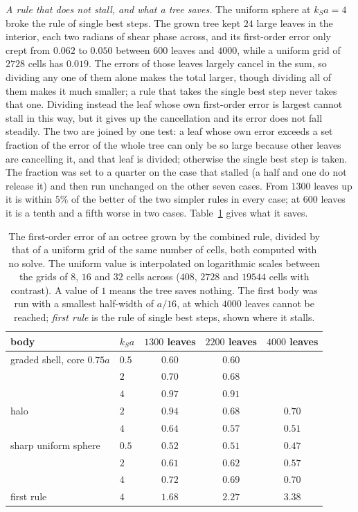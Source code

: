 \documentclass[11pt,a4paper]{article}
\begin{document}
\emph{A rule that does not stall, and what a tree saves.} The uniform sphere at $k_Sa=4$ broke the rule
of single best steps. The grown tree kept $24$ large leaves in the interior, each two radians of shear
phase across, and its first-order error only crept from $0.062$ to $0.050$ between $600$ leaves and $4000$, while a uniform
grid of $2728$ cells has $0.019$. The errors of those leaves largely cancel in the sum, so dividing any
one of them alone makes the total larger, though dividing all of them makes it much smaller; a rule that
takes the single best step never takes that one. Dividing instead the leaf whose own first-order error is
largest cannot stall in this way, but it gives up the cancellation and its error does not fall steadily.
The two are joined by one test: a leaf whose own error exceeds a set fraction of the error of the whole
tree can only be so large because other leaves are cancelling it, and that leaf is divided; otherwise the
single best step is taken. The fraction was set to a quarter on the case that stalled (a half and one do
not release it) and then run unchanged on the other seven cases. From $1300$ leaves up it is within $5\%$ of the
better of the two simpler rules in every case; at $600$ leaves it is a tenth and a fifth worse in two
cases. Table~\ref{tab:greedybodies} gives what it saves.
\begin{table}[htbp]
\centering
\caption{The first-order error of an octree grown by the combined rule, divided by that of a uniform grid
of the same number of cells, both computed with no solve. The uniform value is interpolated on
logarithmic scales between the grids of $8$, $16$ and $32$ cells across ($408$, $2728$ and $19544$ cells
with contrast). A value of $1$ means the tree saves nothing. The first body was run with a smallest
half-width of $a/16$, at which $4000$ leaves cannot be reached; \emph{first rule} is the rule of single best steps,
shown where it stalls.}\label{tab:greedybodies}
\small
\begin{tabular}{@{}llccc@{}}
\toprule
body & $k_Sa$ & $1300$ leaves & $2200$ leaves & $4000$ leaves \\
\midrule
graded shell, core $0.75a$ & $0.5$ & $0.60$ & $0.60$ & \\
                           & $2$   & $0.70$ & $0.68$ & \\
                           & $4$   & $0.97$ & $0.91$ & \\
\midrule
halo                       & $2$   & $0.94$ & $0.68$ & $0.70$ \\
                           & $4$   & $0.64$ & $0.57$ & $0.51$ \\
\midrule
sharp uniform sphere       & $0.5$ & $0.52$ & $0.51$ & $0.47$ \\
                           & $2$   & $0.61$ & $0.62$ & $0.57$ \\
                           & $4$   & $0.72$ & $0.69$ & $0.70$ \\
\quad first rule           & $4$   & $1.68$ & $2.27$ & $3.38$ \\
\bottomrule
\end{tabular}
\end{table}
\end{document}
